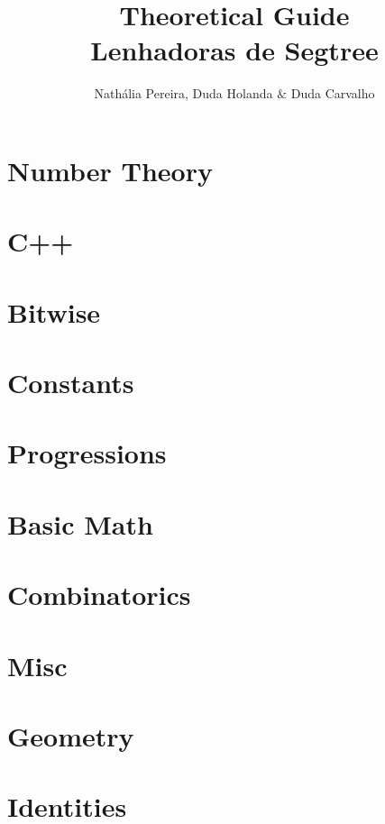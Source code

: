 \documentclass[10pt, twocolumn]{article}
\title{\vspace{-2cm}\textbf{Theoretical Guide\\Lenhadoras de Segtree}}
\author{Nathália Pereira, Duda Holanda $\&$ Duda Carvalho}
\date{}
\begin{document}
\maketitle
\tableofcontents\section{Number Theory}







\section{C++}


\section{Bitwise}




\section{Constants}

\section{Progressions}


\section{Basic Math}


\section{Combinatorics}

\section{Misc}


\section{Geometry}







\section{Identities}

\end{document}
